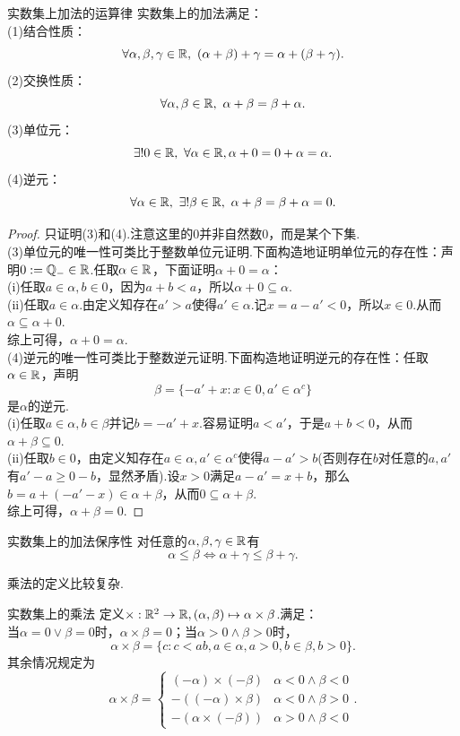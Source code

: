 \begin{proposition}{实数集上加法的运算律}
	实数集上的加法满足： \\
	(1)结合性质：$$\forall \alpha ,\beta ,\gamma \in \mathbb{R} ,~(\alpha + \beta ) + \gamma = \alpha + (\beta + \gamma).$$
	(2)交换性质：$$\forall \alpha ,\beta \in \mathbb{R},~\alpha + \beta = \beta + \alpha .$$
	(3)单位元：$$\exists ! 0 \in \mathbb{R} ,~\forall \alpha \in \mathbb{R} , \alpha + 0 = 0 + \alpha = \alpha .$$
	(4)逆元：$$\forall \alpha \in \mathbb{R} ,~\exists ! \beta \in \mathbb{R} ,~\alpha + \beta = \beta + \alpha = 0.$$
\end{proposition}
\begin{proof}
	只证明(3)和(4).注意这里的$0$并非自然数$0$，而是某个下集. \\
	(3)单位元的唯一性可类比于整数单位元证明.下面构造地证明单位元的存在性：声明$0 := \mathbb{Q}_{-} \in \mathbb{R}$.任取$\alpha \in \mathbb{R}$，下面证明$\alpha + 0 = \alpha$： \\
	(i)任取$a \in \alpha ,b \in 0$，因为$a + b < a$，所以$\alpha + 0 \subseteq \alpha$. \\
	(ii)任取$a \in \alpha$.由定义知存在$a'>a$使得$a' \in \alpha$.记$x=a-a'<0$，所以$x \in 0$.从而$\alpha \subseteq \alpha + 0$. \\
	综上可得，$\alpha +0 = \alpha$. \\
	(4)逆元的唯一性可类比于整数逆元证明.下面构造地证明逆元的存在性：任取$\alpha \in \mathbb{R}$，声明$$\beta = \{ -a'+x:x \in 0,a' \in \alpha ^c \}$$是$\alpha$的逆元. \\
	(i)任取$a \in \alpha ,b \in \beta$并记$b=-a'+x$.容易证明$a<a'$，于是$a+b <0$，从而$\alpha + \beta \subseteq 0$. \\
	(ii)任取$b \in 0$，由定义知存在$a \in \alpha ,a' \in \alpha ^c$使得$a - a'>b$(否则存在$b$对任意的$a,a'$有$a'-a \geq 0-b$，显然矛盾).设$x>0$满足$a-a'=x+b$，那么$b=a+(-a'-x) \in \alpha + \beta$，从而$0 \subseteq \alpha + \beta$. \\
	综上可得，$\alpha + \beta = 0$.
\end{proof}

\begin{proposition}{实数集上的加法保序性}
	对任意的$\alpha ,\beta ,\gamma \in \mathbb{R}$有$$\alpha \leq \beta \Leftrightarrow \alpha + \gamma \leq \beta + \gamma .$$
\end{proposition}

乘法的定义比较复杂.

\begin{definition}{实数集上的乘法}
	定义$\times :\mathbb{R} ^2 \to \mathbb{R} ,(\alpha ,\beta) \mapsto \alpha \times \beta$.满足： \\
	当$\alpha = 0 \vee \beta = 0$时，$\alpha \times \beta =0$；当$\alpha >0 \wedge \beta >0$时，$$\alpha \times \beta = \{ c:c<ab,a \in \alpha ,a>0,b \in \beta ,b>0 \}.$$
	其余情况规定为$$\alpha \times \beta = \begin{cases}
		(-\alpha) \times (-\beta)  & \alpha < 0 \wedge \beta < 0 \\
		-((-\alpha) \times \beta)  & \alpha < 0 \wedge \beta > 0 \\
		-(\alpha \times (-\beta))  & \alpha > 0 \wedge \beta < 0
	\end{cases}.$$
\end{definition}


